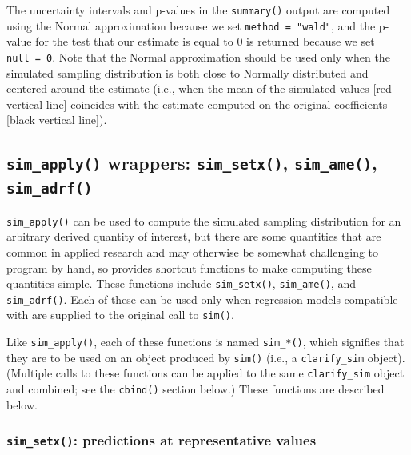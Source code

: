 The uncertainty intervals and p-values in the \texttt{summary()} output are computed using the Normal approximation because we set \texttt{method\ =\ "wald"}, and the p-value for the test that our estimate is equal to 0 is returned because we set \texttt{null\ =\ 0}. Note that the Normal approximation should be used only when the simulated sampling distribution is both close to Normally distributed and centered around the estimate (i.e., when the mean of the simulated values {[}red vertical line{]} coincides with the estimate computed on the original coefficients {[}black vertical line{]}).

\hypertarget{sim_apply-wrappers-sim_setx-sim_ame-sim_adrf}{%
\subsection{\texorpdfstring{\texttt{sim\_apply()} wrappers: \texttt{sim\_setx()}, \texttt{sim\_ame()}, \texttt{sim\_adrf()}}{sim\_apply() wrappers: sim\_setx(), sim\_ame(), sim\_adrf()}}\label{sim_apply-wrappers-sim_setx-sim_ame-sim_adrf}}

\texttt{sim\_apply()} can be used to compute the simulated sampling distribution for an arbitrary derived quantity of interest, but there are some quantities that are common in applied research and may otherwise be somewhat challenging to program by hand, so  provides shortcut functions to make computing these quantities simple. These functions include \texttt{sim\_setx()}, \texttt{sim\_ame()}, and \texttt{sim\_adrf()}. Each of these can be used only when regression models compatible with  are supplied to the original call to \texttt{sim()}.

Like \texttt{sim\_apply()}, each of these functions is named \texttt{sim\_*()}, which signifies that they are to be used on an object produced by \texttt{sim()} (i.e., a \texttt{clarify\_sim} object). (Multiple calls to these functions can be applied to the same \texttt{clarify\_sim} object and combined; see the \texttt{cbind()} section below.) These functions are described below.

\hypertarget{sim_setx-predictions-at-representative-values}{%
\subsubsection{\texorpdfstring{\texttt{sim\_setx()}: predictions at representative values}{sim\_setx(): predictions at representative values}}\label{sim_setx-predictions-at-representative-values}}

